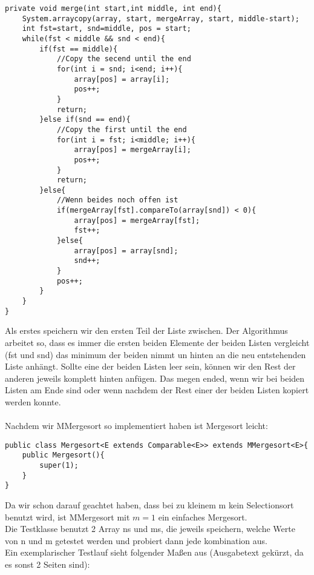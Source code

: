 \documentclass[11pt,a4paper,ngerman]{article}
\begin{document}
\begin{lstlisting}
private void merge(int start,int middle, int end){
	System.arraycopy(array, start, mergeArray, start, middle-start);
	int fst=start, snd=middle, pos = start;
	while(fst < middle && snd < end){
		if(fst == middle){
			//Copy the secend until the end
			for(int i = snd; i<end; i++){
				array[pos] = array[i];
				pos++;
			}
			return; 
		}else if(snd == end){
			//Copy the first until the end
			for(int i = fst; i<middle; i++){
				array[pos] = mergeArray[i];
				pos++;
			}	
			return; 
		}else{
			//Wenn beides noch offen ist
			if(mergeArray[fst].compareTo(array[snd]) < 0){
				array[pos] = mergeArray[fst];
				fst++;
			}else{
				array[pos] = array[snd];
				snd++;
			}
			pos++;
		}
	}
}
\end{lstlisting}
Als erstes speichern wir den ersten Teil der Liste zwischen. Der Algorithmus arbeitet so, dass es immer die ersten beiden Elemente der beiden Listen vergleicht (fst und snd) das minimum der beiden nimmt un hinten an die neu entstehenden Liste anhängt. Sollte eine der beiden Listen leer sein, können wir den Rest der anderen jeweils komplett hinten anfügen. Das megen ended, wenn wir bei beiden Listen am Ende sind oder wenn nachdem der Rest einer der beiden Listen kopiert werden konnte.\\
\vspace{\baselineskip}\\
Nachdem wir MMergesort so implementiert haben ist Mergesort leicht:
\begin{lstlisting}
public class Mergesort<E extends Comparable<E>> extends MMergesort<E>{	
	public Mergesort(){
		super(1);
	}
}
\end{lstlisting}
Da wir schon darauf geachtet haben, dass bei zu kleinem m kein Selectionsort benutzt wird, ist MMergesort mit $m=1$ ein einfaches Mergesort.\\
Die Testklasse benutzt 2 Array ns und ms, die jeweils speichern, welche Werte von n und m getestet werden und probiert dann jede kombination aus.\\
Ein exemplarischer Testlauf sieht folgender Maßen aus (Ausgabetext gekürzt, da es sonst 2 Seiten sind):
\end{document}
